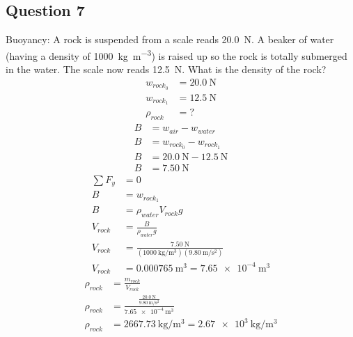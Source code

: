 \documentclass{article}
\begin{document}
\subsection{Question 7}

Buoyancy: A rock is suspended from a scale reads \SI{20.0}{\newton}. A beaker of water (having a density of \SI{1000}{\kilogram \per \meter \cubed}) is raised up so the rock is totally submerged in the water. The scale now reads \SI{12.5}{\newton}. What is the density of the rock?
\begin{align*}
	w_{rock_0} & = \SI{20.0}{\newton} \\
	w_{rock_1} & = \SI{12.5}{\newton} \\
	\rho_{rock} & = ?
\end{align*}
\begin{align*}
	B & = w_{air} - w_{water} \\
	B & = w_{rock_0} - w_{rock_1} \\
	B & = \SI{20.0}{\newton} - \SI{12.5}{\newton} \\
	B & = \SI{7.50}{\newton}
\end{align*}
\begin{align*}
	\sum F_y & = 0 \\
	B & = w_{rock_1} \\
	B & = \rho_{water}V_{rock}g \\
	V_{rock} & = \frac{ B }{ \rho_{water}g } \\
	V_{rock} & = \frac{ \SI{7.50}{\newton} }{ (\SI{1000}{\kilogram \per \meter \cubed})(\SI{9.80}{\meter \per \second \squared}) } \\
	V_{rock} & = \SI{0.000765}{\meter \cubed} = \SI{7.65e-4}{\meter \cubed}
\end{align*}
\begin{align*}
	\rho_{rock} & = \frac{ m_{rock} }{ V_{rock} } \\
	\rho_{rock} & = \frac{ \frac{ \SI{20.0}{\newton} }{ \SI{9.80}{\meter \per \second \squared} } }{ \SI{7.65e-4}{\meter \cubed} } \\
	\rho_{rock} & = \SI{2667.73}{\kilogram \per \meter \cubed} = \SI{2.67e3}{\kilogram \per \meter \cubed}
\end{align*}
\end{document}
